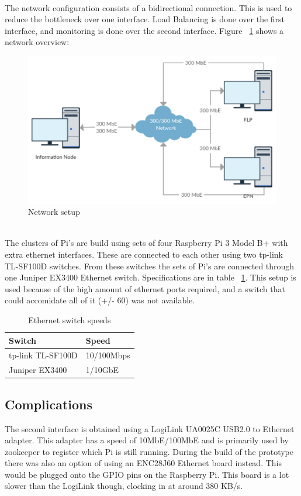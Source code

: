 \newpage

~\\ The network configuration consists of a bidirectional connection. This is used to reduce the bottleneck over one interface. Load Balancing is done over the first interface, and monitoring is done over the second interface. Figure ~\ref{fig:NetworkSetup} shows a network overview:
\begin{figure}[htb]
    \centering
    \includegraphics[scale=0.5]{./graphics/Network_thesis.pdf}
    \caption{Network setup}
    \label{fig:NetworkSetup}
\end{figure}

~\\ The clusters of Pi's are build using sets of four Raspberry Pi 3 Model B+ with extra ethernet interfaces. These are connected to each other using two tp-link TL-SF100D switches. From these switches the sets of Pi's are connected through one Juniper EX3400 Ethernet switch. Specifications are in table ~\ref{table:EthernetSpeeds}. This setup is used because of the high amount of ethernet ports required, and a switch that could accomidate all of it (+/- 60) was not available.

\begin{table}[htb]
\begin{tabular}{| l | l |}
\hline
Switch & Speed \\ \hline
tp-link TL-SF100D & 10/100Mbps \\ \hline
Juniper EX3400 & 1/10GbE \\
\hline
\end{tabular}
\caption{Ethernet switch speeds}
\label{table:EthernetSpeeds}
\end{table}

\subsection{Complications}
The second interface is obtained using a LogiLink UA0025C USB2.0 to Ethernet adapter. This adapter has a speed of 10MbE/100MbE and is primarily used by zookeeper to register which Pi is still running. During the build of the prototype there was also an option of using an ENC28J60 Ethernet board instead. This would be plugged onto the GPIO pins on the Raspberry Pi. This board is a lot slower than the LogiLink though, clocking in at around 380 KB/s. 

